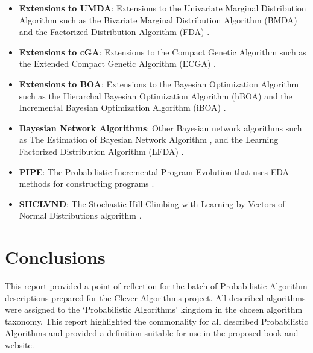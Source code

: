 \documentclass[a4paper, 11pt]{article}
\begin{document}
\begin{itemize}
	\item \textbf{Extensions to UMDA}: Extensions to the Univariate Marginal Distribution Algorithm such as the Bivariate Marginal Distribution Algorithm (BMDA) \cite{Pelikan1998, Pelikan1999} and the Factorized Distribution Algorithm (FDA) \cite{Muhlenbein1999}.
	\item \textbf{Extensions to cGA}: Extensions to the Compact Genetic Algorithm such as the Extended Compact Genetic Algorithm (ECGA) \cite{Harik1999a, Harik2006}.
	\item \textbf{Extensions to BOA}: Extensions to the Bayesian Optimization Algorithm such as the Hierarchal Bayesian Optimization Algorithm (hBOA) \cite{Pelikan2000, Pelikan2001b} and the Incremental Bayesian Optimization Algorithm (iBOA) \cite{Pelikan2008}.
	\item \textbf{Bayesian Network Algorithms}: Other Bayesian network algorithms such as The Estimation of Bayesian Network Algorithm \cite{Etxeberria1999}, and the Learning Factorized Distribution Algorithm (LFDA) \cite{Muehlenbein1999}.
	\item \textbf{PIPE}: The Probabilistic Incremental Program Evolution that uses EDA methods for constructing programs \cite{Salustowicz1997}. 
	\item \textbf{SHCLVND}: The Stochastic Hill-Climbing with Learning by Vectors of Normal Distributions algorithm \cite{Rudlof1996}.
\end{itemize}

% 
% 
\section{Conclusions}
\label{sec:conclusions}
This report provided a point of reflection for the batch of Probabilistic Algorithm descriptions prepared for the Clever Algorithms project. All described algorithms were assigned to the `Probabilistic Algorithms' kingdom in the chosen algorithm taxonomy. This report highlighted the commonality for all described Probabilistic Algorithms and provided a definition suitable for use in the proposed book and website.



\end{document}
